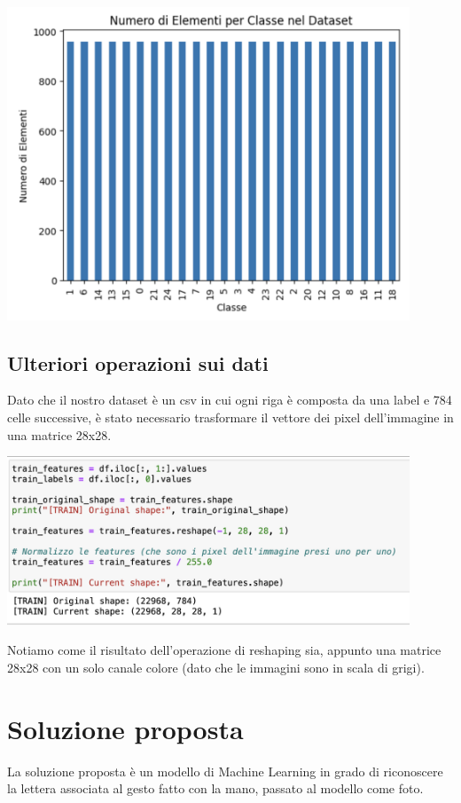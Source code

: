 \documentclass{article}
\begin{document}
\begin{center}
    \includegraphics[width=0.9\textwidth]{dataset_bilanciato.png}
\end{center}

\subsection{Ulteriori operazioni sui dati}
Dato che il nostro dataset è un csv in cui ogni riga è composta da una label e 784 celle successive, è stato necessario trasformare il vettore dei pixel dell'immagine in una matrice 28x28.
\begin{center}
    \includegraphics[width=0.9\textwidth]{shape.png}
\end{center}
Notiamo come il risultato dell'operazione di reshaping sia, appunto una matrice 28x28 con un solo canale colore (dato che le immagini sono in scala di grigi).


\newpage
\section{Soluzione proposta}
La soluzione proposta è un modello di Machine Learning in grado di riconoscere la lettera associata al gesto fatto con la mano, passato al modello come foto.
\end{document}
